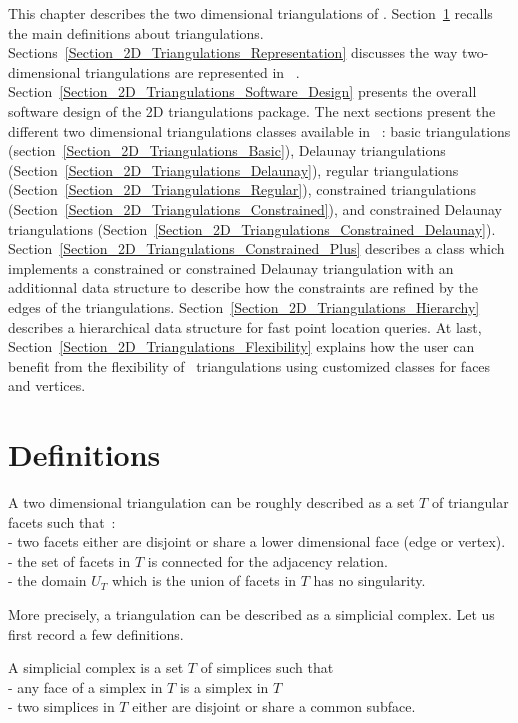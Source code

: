This chapter describes the two dimensional triangulations
of \cgal. 
Section~\ref{Section_2D_Triangulations_Definitions} recalls the
main definitions about triangulations.
Sections~\ref{Section_2D_Triangulations_Representation} discusses
the way two-dimensional triangulations are represented in \cgal\ .
Section~\ref{Section_2D_Triangulations_Software_Design} presents
the overall software
design of the 2D triangulations package. 
The next sections present the different two dimensional triangulations classes
available in  \cgal\ : 
basic triangulations (section~\ref{Section_2D_Triangulations_Basic}),
Delaunay triangulations
(Section~\ref{Section_2D_Triangulations_Delaunay}),
regular triangulations
(Section~\ref{Section_2D_Triangulations_Regular}),
constrained triangulations
(Section~\ref{Section_2D_Triangulations_Constrained}),
and constrained Delaunay triangulations
(Section~\ref{Section_2D_Triangulations_Constrained_Delaunay}).
Section~\ref{Section_2D_Triangulations_Constrained_Plus}
describes a class which implements a constrained or
constrained Delaunay triangulation  with
an additionnal data structure 
to describe how the constraints are refined 
by the edges of the triangulations.
Section~\ref{Section_2D_Triangulations_Hierarchy}
describes a hierarchical data structure for
fast point location queries.
At last, Section~\ref{Section_2D_Triangulations_Flexibility} 
explains how the user can  benefit  from the flexibility 
of  \cgal\ triangulations using customized classes for faces
and vertices.

\section{Definitions}
\label{Section_2D_Triangulations_Definitions}

A two dimensional triangulation can be roughly described as a set $T$
of triangular facets such that~:\\
- two facets either are  disjoint or share a lower dimensional
face (edge or vertex).\\
- the set of facets in  $T$ is connected for the adjacency relation. \\
- the  domain $U_T$  which is the union
of facets in $T$ has no singularity.


More precisely, a triangulation can be described 
as a simplicial complex.
Let us first record a few definitions.

A simplicial complex is a set $T$  of simplices such that~\\
- any face of a simplex in $T$ is a simplex in $T$ \\
- two simplices in $T$  either are disjoint or  share
  a common subface.

